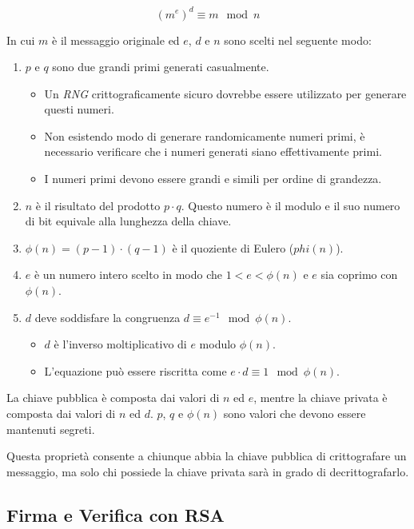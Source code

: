 $$(m^e)^d \equiv m \mod n$$

\noindent In cui $m$ è il messaggio originale ed $e$, $d$ e $n$ sono scelti nel seguente modo:
\begin{enumerate}
	\item $p$ e $q$ sono due grandi primi generati casualmente.
	      \begin{itemize}
		      \item Un \emph{\gls{RNG}} crittograficamente sicuro dovrebbe essere utilizzato per generare questi numeri.
		      \item Non esistendo modo di generare randomicamente numeri primi, è necessario verificare che i numeri generati siano effettivamente primi.
		      \item I numeri primi devono essere grandi e simili per ordine di grandezza.
	      \end{itemize}
	\item $n$ è il risultato del prodotto $p \cdot q$. Questo numero è il modulo e il suo numero di bit equivale alla lunghezza della chiave.
	\item $\phi(n) = (p - 1) \cdot (q - 1)$ è il quoziente di Eulero ($phi(n)$).
	\item $e$ è un numero intero scelto in modo che $1 < e < \phi(n)$ e $e$ sia coprimo con $\phi(n)$.
	\item $d$ deve soddisfare la congruenza $d \equiv e^{-1} \mod \phi(n)$.
	      \begin{itemize}
		      \item $d$ è l'inverso moltiplicativo di $e$ modulo $\phi(n)$.
		      \item L'equazione può essere riscritta come $e \cdot d \equiv 1 \mod \phi(n)$.
	      \end{itemize}
\end{enumerate}

La chiave pubblica è composta dai valori di $n$ ed $e$, mentre la chiave privata è composta dai valori di $n$ ed $d$.
$p$, $q$ e $\phi(n)$ sono valori che devono essere mantenuti segreti.

Questa proprietà consente a chiunque abbia la chiave pubblica di crittografare un messaggio, ma solo chi possiede la chiave privata sarà in grado di decrittografarlo.

\subsection{Firma e Verifica con RSA}
\label{cap:rsassa}

